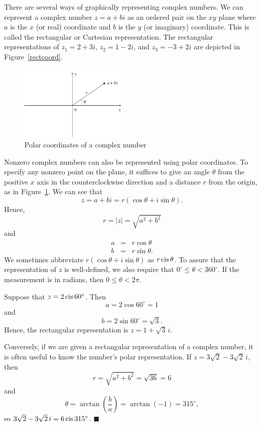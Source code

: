  
There are several ways of graphically representing complex numbers. We
can represent a complex number $z = a +bi$ as an ordered pair on the
$xy$ plane where $a$ is the $x$ (or real) coordinate and $b$ is the $y$
(or imaginary) coordinate. This is called the {\bfi rectangular} or
{\bfi Cartesian} representation. The rectangular representations of
$z_1 = 2 + 3i$, $z_2 = 1 - 2i$, and $z_3 = - 3 + 2i$ are depicted in
Figure~\ref{rectcoord}.
 
 
\begin{figure}[htb]
\begin{center}
\centerline {
\includegraphics[width=2in]{polarcoord}
}
\end{center}
\caption{Polar coordinates of a complex number}
\label{polarcoord}
\end{figure}
 
 
Nonzero complex numbers can also be represented using {\bfi polar
coordinates}.  To specify  any nonzero point on the plane, it suffices
to give an angle $\theta$ from the positive $x$ axis in the
counterclockwise direction and a distance $r$ from the origin, as in 
Figure~\ref{polarcoord}. We can see that 
$$
z = a + bi = r( \cos \theta + i \sin \theta).
$$
Hence,
$$
r = |z| = \sqrt{a^2+b^2}
$$
and
\begin{eqnarray*}
a & = & r \cos \theta \\
b & = & r \sin \theta.
\end{eqnarray*}
We sometimes abbreviate $r( \cos \theta + i \sin \theta)$ as $r \operatorname{cis}
\theta$\label{cosisin}.  To assure that the representation of $z$ is 
well-defined, we also require that $0^{\circ} \leq \theta <
360^{\circ}$.  If the measurement is in radians, then $0 \leq \theta <
2 \pi$. 
 
 
\vspace{ 2ex }
 
 
Suppose that $z = 2 \operatorname{cis}  60^{\circ}$. Then
$$
a  =  2 \cos 60^{\circ}  =   1
$$
and
$$
b  =  2 \sin 60^{\circ}  =  \sqrt{3}.
$$
Hence, the rectangular representation is $z = 1+\sqrt{3}\, i$.
 
 
Conversely, if we are given a rectangular representation of a complex
number, it is often useful to know the number's polar representation.
If $z = 3 \sqrt{2} - 3 \sqrt{2}\, i$, then 
$$
r = \sqrt{a^2 + b^2} = \sqrt{36 } = 6
$$
and
$$
\theta = \arctan \left( \frac{b}{a} \right) = \arctan( - 1) =
315^{\circ},
$$
so $3 \sqrt{2} - 3 \sqrt{2}\, i=6 \operatorname{cis}  315^{\circ}$.
\hspace{\fill} $\blacksquare$
 

